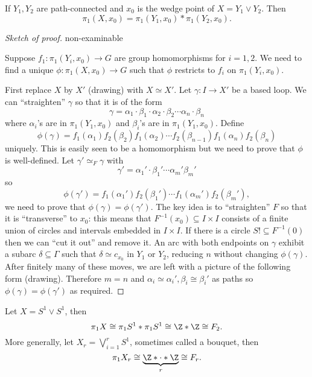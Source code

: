 \documentclass[a4paper]{article}
\newcommand{\w}{\vee}
\begin{document}
\begin{theorem}
  If \(Y_1, Y_2\) are path-connected and \(x_0\) is the wedge point of \(X = Y_1 \w Y_2\). Then
  \[
    \pi_1(X, x_0) = \pi_1(Y_1, x_0) * \pi_1(Y_2, x_0).
  \]
\end{theorem}

\begin{proof}[Sketch of proof]
  non-examinable

  Suppose \(f_1: \pi_1(Y_i, x_0) \to G\) are group homomorphisms for \(i = 1, 2\). We need to find a unique \(\phi: \pi_1(X, x_0) \to G\) such that \(\phi\) restricts to \(f_i\) on \(\pi_1(Y_i, x_0)\).

  First replace \(X\) by \(X'\) (drawing) with \(X \simeq X'\). Let \(\gamma: I \to X'\) be a based loop. We can ``straighten'' \(\gamma\) so that it is of the form
  \[
    \gamma = \alpha_1 \cdot \beta_1 \cdot \alpha_2 \cdot \beta_2 \cdots \alpha_n \cdot \beta_n
  \]
  where \(\alpha_i\)'s are in \(\pi_1(Y_1, x_0)\) and \(\beta_i\)'s are in \(\pi_1(Y_1, x_0)\). Define
  \[
    \phi(\gamma) = f_1(\alpha_1) f_2(\beta_2) f_1(\alpha_2) \cdots f_2(\beta_{n - 1}) f_1(\alpha_n) f_2(\beta_n)
  \]
  uniquely. This is easily seen to be a homomorphism but we need to prove that \(\phi\) is well-defined. Let \(\gamma' \simeq_F \gamma\) with
  \[
    \gamma' = \alpha_1' \cdot \beta_1' \cdots \alpha_m' \beta_m'
  \]
  so
  \[
    \phi(\gamma') = f_1(\alpha_1')f_2(\beta_1') \cdots f_1(\alpha_m') f_2(\beta_m'),
  \]
  we need to prove that \(\phi(\gamma) = \phi(\gamma')\). The key idea is to ``straighten'' \(F\) so that it is ``transverse'' to \(x_0\): this means that \(F^{-1}(x_0) \subseteq I \times I\) consists of a finite union of circles and intervals embedded in \(I \times I\). If there is a circle \(S! \subseteq F^{-1}(0)\) then we can ``cut it out'' and remove it. An arc with both endpoints on \(\gamma\) exhibit a subarc \(\delta \subseteq \Gamma\) such that \(\delta \simeq c_{x_0}\) in \(Y_1\) or \(Y_2\), reducing \(n\) without changing \(\phi(\gamma)\). After finitely many of these moves, we are left with a picture of the following form (drawing). Therefore \(m = n\) and \(\alpha_i \simeq \alpha_i', \beta_i \cong \beta_i'\) as paths so \(\phi(\gamma) = \phi(\gamma')\) as required.
\end{proof}

\begin{eg}
  Let \(X = S^1 \w S^1\), then
  \[
    \pi_1 X \cong \pi_1S^1 * \pi_1S^1 \cong \Z * \Z \cong F_2.
  \]
  More generally, let \(X_r = \bigvee_{i = 1}^r S^1\), sometimes called a bouquet, then
  \[
    \pi_1 X_r \cong \underbrace{\Z * \cdot * \Z}_{r} \cong F_r.
  \]
\end{eg}
\end{document}
